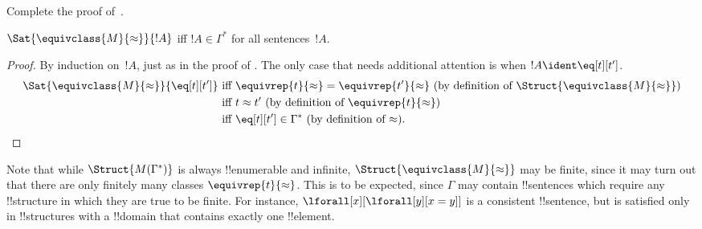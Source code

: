 \documentclass[../../../include/open-logic-section]{subfiles}
\begin{document}
\begin{prob}
Complete the proof of~.
\end{prob}

\begin{lem}
$\Sat{\equivclass{M}{\approx}}{!A}$ iff $!A \in \Gamma^*$ for all
  sentences~$!A$.
\end{lem}

\begin{proof}
By induction on~$!A$, just as in the proof of .
The only case that needs additional attention is when $!A \ident
\eq[t][t']$.
\begin{align*}
\Sat{\equivclass{M}{\approx}}{\eq[t][t']} & \text{ iff } \equivrep{t}{\approx} = \equivrep{t'}{\approx}
\text{ (by definition of $\Struct{\equivclass{M}{\approx}}$)}\\
& \text{ iff } t \approx t' \text{ (by definition of $\equivrep{t}{\approx}$)}\\
& \text{ iff } \eq[t][t'] \in \Gamma^* \text{ (by definition of $\approx$).}
\end{align*}
\end{proof}

\begin{digress}
Note that while $\Struct{M(\Gamma^*)}$ is always !!{enumerable} and
infinite, $\Struct{\equivclass{M}{\approx}}$ may be finite, since it
may turn out that there are only finitely many classes
$\equivrep{t}{\approx}$.  This is to be expected, since $\Gamma$ may
contain !!{sentence}s which require any !!{structure} in which they
are true to be finite.  For instance, $\lforall[x][\lforall[y][x =
y]]$ is a consistent !!{sentence}, but is satisfied only in
!!{structure}s with a !!{domain} that contains exactly one
!!{element}.
\end{digress}
\end{document}

